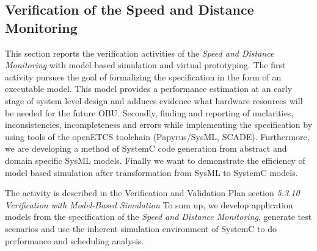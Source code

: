 %
%
%
%
%
%
%


\subsection{Verification of the Speed and Distance Monitoring}

This section reports the verification activities of the \emph{Speed and Distance Monitoring} with model based simulation and virtual prototyping. The first activity pursues the goal of formalizing the specification in the form of an executable model. This model provides a performance estimation at an early stage of system level design and adduces evidence what hardware resources will be needed for the future OBU. Secondly, finding and reporting of unclarities, inconsistencies, incompleteness and errors while implementing the specification by using tools of the openETCS toolchain (Papyrus/SysML, SCADE). Furthermore, we are developing a method of SystemC code generation from abstract and domain specific SysML models. Finally we want to demonstrate the efficiency of model based simulation after transformation from SysML to SystemC models.

The activity is described in the Verification and Validation Plan
section {\em 5.3.10 Verification with Model-Based Simulation} \cite{D4.1_2013}
To sum up, we develop application models from the specification of the \emph{Speed and Distance Monitoring}, generate test scenarios and use the inherent simulation environment of SystemC to do performance and scheduling analysis.

